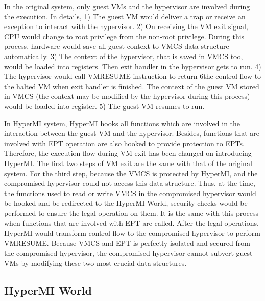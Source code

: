 \documentclass[conference]{IEEEtran}
\begin{document}
In the original system, only guest VMs and the hypervisor are involved during the execution. In details, 1) The guest VM would deliver a trap or receive an exception to interact with the hypervisor. 2) On receiving the VM exit signal, CPU would change to root privilege from the non-root privilege. During this process, hardware would save all guest context to VMCS data structure automatically. 3) The context of the hypervisor, that is saved in VMCS too, would be loaded into registers. Then exit handler in the hypervisor gets to run. 4) The hypervisor would call VMRESUME instruction to return 6the control flow to the halted VM when exit handler is finished. The context of the guest VM stored in VMCS (the context may be modified by the hypervisor during this process) would be loaded into register. 5) The guest VM resumes to run.

In HyperMI system, HyperMI hooks all functions which are involved in the interaction between the guest VM and the hypervisor. Besides, functions that are involved with EPT operation are also hooked to provide protection to EPTs. Therefore, the execution flow during VM exit has been changed on introducing HyperMI. The first two steps of VM exit are the same with that of the original system. For the third step, because the VMCS is protected by HyperMI, and the compromised hypervisor could not access this data structure. Thus, at the time, the functions used to read or write VMCS in the compromised hypervisor would be hooked and be redirected to the HyperMI World, security checks would be performed to ensure the legal operation on them. It is the same with this process when functions that are involved with EPT are called. 
After the legal operations, HyperMI would transform control flow to the compromised hypervisor to perform VMRESUME. Because VMCS and EPT is perfectly isolated and secured from the compromised hypervisor, the compromised hypervisor cannot subvert guest VMs by modifying these two most crucial data structures.

\fi




\subsection{HyperMI World} \label {HWorld}
\end{document}
